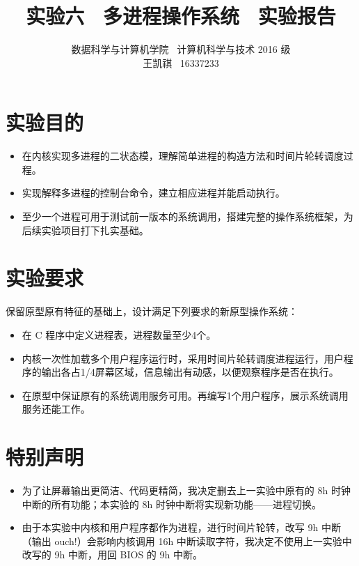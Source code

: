 \documentclass{article}
\begin{document}
\title{实验六 \ 多进程操作系统 \ 实验报告}
\author {数据科学与计算机学院 \ 计算机科学与技术 2016 级 \\ 王凯祺 \ 16337233}
\maketitle

\section{实验目的}

\begin{itemize}
\item 在内核实现多进程的二状态模，理解简单进程的构造方法和时间片轮转调度过程。
\item 实现解释多进程的控制台命令，建立相应进程并能启动执行。
\item 至少一个进程可用于测试前一版本的系统调用，搭建完整的操作系统框架，为后续实验项目打下扎实基础。
\end{itemize}

\section{实验要求}

保留原型原有特征的基础上，设计满足下列要求的新原型操作系统：

\begin{itemize}
\item 在 C 程序中定义进程表，进程数量至少4个。
\item 内核一次性加载多个用户程序运行时，采用时间片轮转调度进程运行，用户程序的输出各占1/4屏幕区域，信息输出有动感，以便观察程序是否在执行。
\item 在原型中保证原有的系统调用服务可用。再编写1个用户程序，展示系统调用服务还能工作。
\end{itemize}

\section{特别声明}

\begin{itemize}
\item 为了让屏幕输出更简洁、代码更精简，我决定删去上一实验中原有的 8h 时钟中断的所有功能；本实验的 8h 时钟中断将实现新功能——进程切换。
\item 由于本实验中内核和用户程序都作为进程，进行时间片轮转，改写 9h 中断（输出 ouch!）会影响内核调用 16h 中断读取字符，我决定不使用上一实验中改写的 9h 中断，用回 BIOS 的 9h 中断。
\end{itemize}
\end{document}
